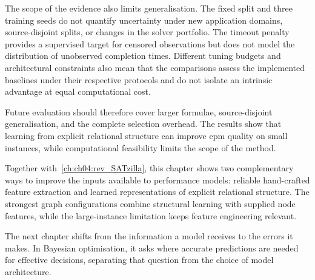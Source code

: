 The scope of the evidence also limits generalisation. The fixed split and three training seeds do not quantify uncertainty under new application domains, source-disjoint splits, or changes in the solver portfolio. The timeout penalty provides a supervised target for censored observations but does not model the distribution of unobserved completion times. Different tuning budgets and architectural constraints also mean that the comparisons assess the implemented baselines under their respective protocols and do not isolate an intrinsic advantage at equal computational cost.

Future evaluation should therefore cover larger formulae, source-disjoint generalisation, and the complete selection overhead. The results show that learning from explicit relational structure can improve \gls{epm} quality on small instances, while computational feasibility limits the scope of the method.

Together with~\cref{ch:ch04:rev_SATzilla}, this chapter shows two complementary ways to improve the inputs available to performance models: reliable hand-crafted feature extraction and learned representations of explicit relational structure. The strongest graph configurations combine structural learning with supplied node features, while the large-instance limitation keeps feature engineering relevant.

The next chapter shifts from the information a model receives to the errors it makes. In Bayesian optimisation, it asks where accurate predictions are needed for effective decisions, separating that question from the choice of model architecture.

